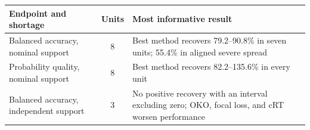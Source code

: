 \begin{tabularx}{\textwidth}{@{}l c X@{}}
\toprule
Endpoint and shortage & Units & Most informative result \\
\midrule
Balanced accuracy, nominal support & 8 & Best method recovers \num{79.2}--\num{90.8}\% in seven units; \num{55.4}\% in aligned severe spread \\
Probability quality, nominal support & 8 & Best method recovers \num{82.2}--\num{135.6}\% in every unit \\
Balanced accuracy, independent support & 3 & No positive recovery with an interval excluding zero; OKO, focal loss, and cRT worsen performance \\
\bottomrule
\end{tabularx}
